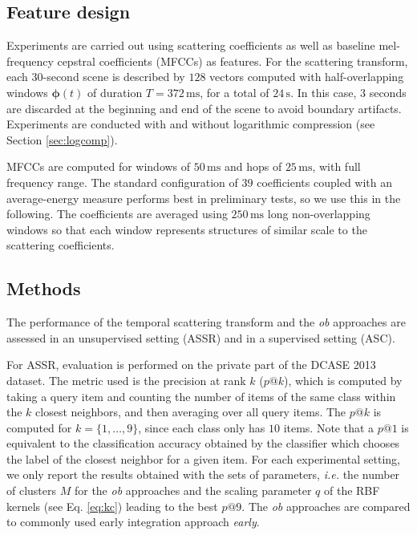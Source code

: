 \documentclass[journal]{IEEEtran}
\newcommand{\ja}[1]{\textcolor{magenta}{Joakim : #1}}
\begin{document}
\subsection{Feature design}

Experiments are carried out using scattering coefficients as well as baseline mel-frequency cepstral coefficients (MFCCs) as features. For the scattering transform, each $30$-second scene is described by $128$ vectors computed with half-overlapping windows $\boldsymbol{\phi}(t)$ of duration $T=372\,\mathrm{ms}$, for a total of $24\,\mathrm{s}$. In this case, $3$ seconds are discarded at the beginning and end of the scene to avoid boundary artifacts. Experiments are conducted with and without logarithmic compression (see Section \ref{sec:logcomp}).

MFCCs are computed for windows of $50\,\mathrm{ms}$ and hops of $25\,\mathrm{ms}$, with full frequency range. The standard configuration of $39$ coefficients coupled with an average-energy measure performs best in preliminary tests, so we use this in the following. The coefficients are averaged using $250\,\mathrm{ms}$ long non-overlapping windows so that each window represents structures of similar scale to the scattering coefficients.



\subsection{Methods}

The performance of the temporal scattering transform and the \emph{ob} approaches are assessed in an unsupervised setting (ASSR) and in a supervised setting (ASC).

For ASSR, evaluation is performed on the private part of the DCASE 2013 dataset. The metric used is the precision at rank $k$ ($p@k$), which is computed by taking a query item and counting the number of items of the same class within the $k$ closest neighbors, and then averaging over all query items. The $p@k$ is computed for $k=\lbrace 1,\ldots,9\rbrace$, since each class only has $10$ items. Note that a $p@1$ is equivalent to the classification accuracy obtained by the classifier which chooses the label of the closest neighbor for a given item. For each experimental setting, we only report the results obtained with the sets of parameters, \emph{i.e.} the number of clusters $M$ for the \emph{ob} approaches and the scaling parameter $q$ of the RBF kernels (see Eq. \ref{eq:kc}) leading to the best $p@9$. The \emph{ob} approaches are compared to commonly used early integration approach \emph{early}.
\end{document}
